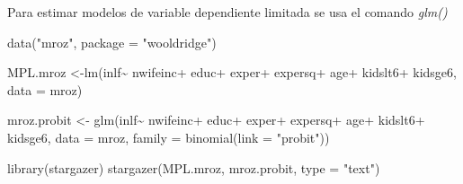 \documentclass[
  letterpaper,
  DIV=11,
  numbers=noendperiod]{scrreprt}
\newenvironment{Shaded}{\begin{snugshade}}{\end{snugshade}}
\newcommand{\AttributeTok}[1]{\textcolor[rgb]{0.40,0.45,0.13}{#1}}
\newcommand{\FunctionTok}[1]{\textcolor[rgb]{0.28,0.35,0.67}{#1}}
\newcommand{\NormalTok}[1]{\textcolor[rgb]{0.00,0.23,0.31}{#1}}
\newcommand{\OtherTok}[1]{\textcolor[rgb]{0.00,0.23,0.31}{#1}}
\newcommand{\SpecialCharTok}[1]{\textcolor[rgb]{0.37,0.37,0.37}{#1}}
\newcommand{\StringTok}[1]{\textcolor[rgb]{0.13,0.47,0.30}{#1}}
\begin{document}
Para estimar modelos de variable dependiente limitada se usa el comando
\emph{glm()}

\begin{Shaded}
\begin{Highlighting}[]
\FunctionTok{data}\NormalTok{(}\StringTok{"mroz"}\NormalTok{, }\AttributeTok{package =} \StringTok{"wooldridge"}\NormalTok{)}

\NormalTok{MPL.mroz }\OtherTok{\textless{}{-}}\FunctionTok{lm}\NormalTok{(inlf}\SpecialCharTok{\textasciitilde{}}
\NormalTok{                 nwifeinc}\SpecialCharTok{+}
\NormalTok{                 educ}\SpecialCharTok{+}
\NormalTok{                 exper}\SpecialCharTok{+}
\NormalTok{                 expersq}\SpecialCharTok{+}
\NormalTok{                 age}\SpecialCharTok{+}
\NormalTok{                 kidslt6}\SpecialCharTok{+}
\NormalTok{                 kidsge6,}
               \AttributeTok{data =}\NormalTok{ mroz) }


\NormalTok{mroz.probit }\OtherTok{\textless{}{-}} \FunctionTok{glm}\NormalTok{(inlf}\SpecialCharTok{\textasciitilde{}}
\NormalTok{                 nwifeinc}\SpecialCharTok{+}
\NormalTok{                 educ}\SpecialCharTok{+}
\NormalTok{                 exper}\SpecialCharTok{+}
\NormalTok{                 expersq}\SpecialCharTok{+}
\NormalTok{                 age}\SpecialCharTok{+}
\NormalTok{                 kidslt6}\SpecialCharTok{+}
\NormalTok{                 kidsge6,}
               \AttributeTok{data =}\NormalTok{ mroz,}
               \AttributeTok{family =} \FunctionTok{binomial}\NormalTok{(}\AttributeTok{link =} \StringTok{"probit"}\NormalTok{))}

\FunctionTok{library}\NormalTok{(stargazer)}
\FunctionTok{stargazer}\NormalTok{(MPL.mroz, mroz.probit, }\AttributeTok{type =} \StringTok{"text"}\NormalTok{)}
\end{Highlighting}
\end{Shaded}
\end{document}
